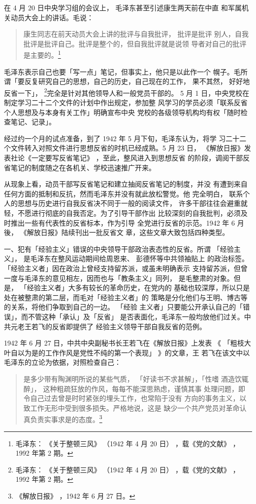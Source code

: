 在 4 月 20 日中央学习组的会议上，
毛泽东甚至引述康生两天前在中直
和军属机关动员大会上的讲话。毛说：
\begin{quote}
{\fzwkai 康生同志在前天动员大会上讲的批评与自我批评，
批评是批评
别人，自我批评是批评自己。批评是整个的，但自我批评就是说领
导者对自己的批评是主要的。\footnote{毛泽东：
《关于整顿三风》
（1942 年 4 月 20 日）
，载《党的文献》
，1992 年第 2 期。}} 
\end{quote}
毛泽东表示自己也要「写一点」笔记，但事实上，他只是以此作一个
幌子。毛所谓「要反复研究自己的思想，自己的历史，自己现在的工作，
果不其然，
好好地反省一下」， \footnote{毛泽东：
《关于整顿三风》
（1942 年 4 月 20 日）
，载《党的文献》
，1992 年第 2 期。}完全是针对其他领导人和一般党员干部的。
5 月 1 日，中央党校在制定学习二十二个文件的计划中作出规定，参加整
风学习的学员必须「联系反省个人思想及与本身有关工作」明确宣布中央
党校的各级领导机构均有权「随时检查笔记、记录」。

经过约一个月的试点准备，到了 1942 年 5 月下旬，毛泽东认为，将学
习二十二个文件转入对照文件进行思想反省的时机已经成熟。5 月 23 日，
《解放日报》发表社论《一定要写反省笔记》
，至此，整风进入到思想反省
的阶段，调阅干部反省笔记的制度随之在各机关、学校迅速推广开来。

从现象上看，动员干部写反省笔记和建立抽阅反省笔记的制度，并没
有遭到来自任何方面的抵制和反抗，然而毛泽东并没有就此放松警觉。他
完全明白，
联系个人的思想与历史进行自我反省决不同于一般的阅读文件，
许多干部往往会避重就轻，不愿进行彻底的自我否定。为了引导干部作出
比较深刻的自我批判，必须及时推出一些有代表性的反省标本，作为引导
全党进行反省的示范。1942 年 6 月後，
《解放日报》陆续刊出一批反省文
章，这些文章大致包括四种类型。

一、犯有「经验主义」错误的中央领导干部政治表态性的反省。所谓
「经验主义」， 是毛泽东在整风运动期间给周恩来、
彭德怀等中共领袖贴上
的政治标签。
「经验主义者」因在政治上曾经支持留苏派，或虽未明确表示
支持留苏派，但曾一度与毛泽东的意见相左，因而也与「教条主义」同列，
是毛整肃的对象。但是，
「经验主义者」大多有较长的革命历史，在党内的
基础也较深厚，所以只是处在被整肃的第二层，而毛对「经验主义者」的
策略是分化他们与王明、博古等的关系，将他们争取到自己的一边。
「经验
主义者」只要能公开承认自己的「错误」，而不管这种「承认」及「反省」
是否表面化，毛泽东一般均放他们过关。中共元老王若飞的反省即提供了
经验主义领导干部自我反省的范例。

1942 年 6 月 27 日，中共中央副秘书长王若飞在《解放日报》上发表
《
「粗枝大叶自以为是的工作作风是党性不纯的第一个表现」
》的文章，王
若飞在该文中以毛泽东的立论为依据，对照检查自己：
\begin{quote}
{\fzwkai 是多少带有陶渊明所说的某些气质，
「好读书不求甚解」，「性嗜
酒造饮辄醉」，
这种粗疏狂放的作风，每每不能深思熟虑，谨慎其事
处理问题，即令自己过去曾是时时紧张的埋头工作，也常陷于没有
方向的事务主义，以致工作无形中受到很多损失。严格地说，这是
缺少一个共产党员对革命认真负责实事求是的态度。\footnote{《解放日报》
，1942 年 6 月 27 日。}} 
\end{quote}

